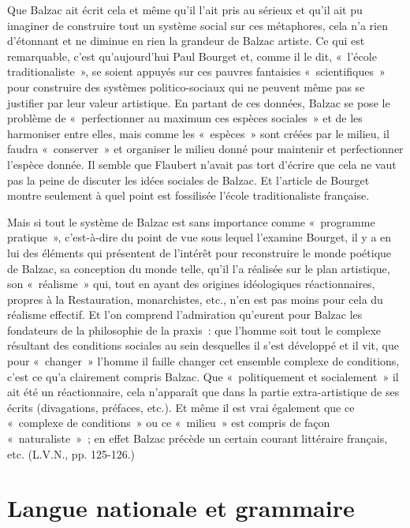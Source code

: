 \documentclass[french,twoside]{book} %
\newcommand\chapteropen{} %
\newcommand\chapterclose{} %
\begin{document}
\noindent Que Balzac ait écrit cela et même qu’il l’ait pris au sérieux et qu’il ait pu imaginer de construire tout un système social sur ces métaphores, cela n’a rien d’étonnant et ne diminue en rien la grandeur de Balzac artiste. Ce qui est remarquable, c’est qu’aujourd’hui Paul Bourget et, comme il le dit, « l’école traditionaliste », se soient appuyés sur ces pauvres fantaisies « scientifiques » pour construire des systèmes politico-sociaux qui ne peuvent même pas se justifier par leur valeur artistique. En partant de ces données, Balzac se pose le problème de « perfectionner au maximum ces espèces sociales » et de les harmoniser entre elles, mais comme les « espèces » sont créées par le milieu, il faudra « conserver » et organiser le milieu donné pour maintenir et perfectionner l’espèce donnée. Il semble que Flaubert n’avait pas tort d’écrire que cela ne vaut pas la peine de discuter les idées sociales de Balzac. Et l’article de Bourget montre seulement à quel point est fossilisée l’école traditionaliste française.\par
Mais si tout le système de Balzac est sans importance comme « programme pratique », c’est-à-dire du point de vue sous lequel l’examine Bourget, il y a en lui des éléments qui présentent de l’intérêt pour reconstruire le monde poétique de Balzac, sa conception du monde telle, qu’il l’a réalisée sur le plan artistique, son « réalisme » qui, tout en ayant des origines idéologiques réactionnaires, propres à la Restauration, monarchistes, etc., n’en est pas moins pour cela du réalisme effectif. Et l’on comprend l’admiration qu’eurent pour Balzac les fondateurs de la philosophie de la praxis : que l’homme soit tout le complexe résultant des conditions sociales au sein desquelles il s’est développé et il vit, que pour « changer » l’homme il faille changer cet ensemble complexe de conditions, c’est ce qu’a clairement compris Balzac. Que « politiquement et socialement » il ait été un réactionnaire, cela n’apparaît que dans la partie extra-artistique de ses écrits (divagations, préfaces, etc.). Et même il est vrai également que ce « complexe de conditions » ou ce « milieu » est compris de façon « naturaliste » ; en effet Balzac précède un certain courant littéraire français, etc. (L.V.N., pp. 125-126.)\par
{\raggedleft \noindent [1932-1933]}
\chapterclose


\chapteropen
\chapter[{Langue nationale et grammaire}]{Langue nationale et grammaire}\renewcommand{\leftmark}{Langue nationale et grammaire}
\end{document}
